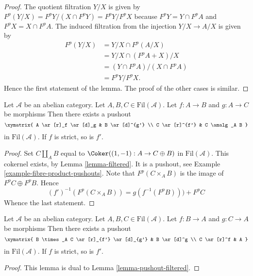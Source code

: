 \begin{proof}
The quotient filtration $Y/X$ is given by
$F^p(Y/X) = F^pY/(X \cap F^pY) = F^pY/F^pX$
because $F^pY = Y \cap F^pA$ and $F^pX = X \cap F^pA$.
The induced filtration from the injection $Y/X \to A/X$ is given by
\begin{align*}
F^p(Y/X) & = Y/X \cap F^p(A/X) \\
& = Y/X \cap (F^pA + X)/X \\
& = (Y \cap F^pA)/(X \cap F^pA) \\
& = F^pY/F^pX.
\end{align*}
Hence the first statement of the lemma.
The proof of the other cases is similar.
\end{proof}

\begin{lemma}
\label{lemma-pushout-filtered}
Let $\mathcal{A}$ be an abelian category.
Let $A, B, C \in \text{Fil}(\mathcal{A})$.
Let $f : A \to B$ and $g : A \to C$ be morphisms
Then there exists a pushout
$$
\xymatrix{
A \ar[r]_f \ar[d]_g & B \ar[d]^{g'} \\
C \ar[r]^{f'} & C \amalg_A B
}
$$
in $\text{Fil}(\mathcal{A})$. If $f$ is strict, so is $f'$.
\end{lemma}

\begin{proof}
Set $C \amalg_A B$ equal to $\Coker((1, -1) : A \to C \oplus B)$
in $\text{Fil}(\mathcal{A})$. This cokernel exists, by
Lemma \ref{lemma-filtered}.
It is a pushout, see
Example \ref{example-fibre-product-pushouts}.
Note that $F^p(C \times_A B)$ is the image of $F^pC \oplus F^pB$.
Hence
$$
(f')^{-1}(F^p(C \times_A B)) = g(f^{-1}(F^pB))) + F^pC
$$
Whence the last statement.
\end{proof}

\begin{lemma}
\label{lemma-fibre-product-filtered}
Let $\mathcal{A}$ be an abelian category.
Let $A, B, C \in \text{Fil}(\mathcal{A})$.
Let $f : B \to A$ and $g : C \to A$ be morphisms
Then there exists a pushout
$$
\xymatrix{
B \times_A C \ar[r]_{f'} \ar[d]_{g'} & B \ar[d]^g \\
C \ar[r]^f & A
}
$$
in $\text{Fil}(\mathcal{A})$. If $f$ is strict, so is $f'$.
\end{lemma}

\begin{proof}
This lemma is dual to
Lemma \ref{lemma-pushout-filtered}.
\end{proof}

